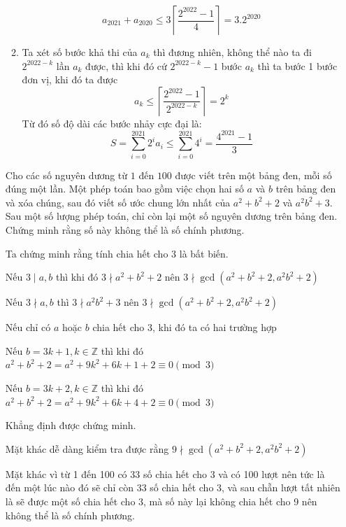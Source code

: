 \documentclass[11pt]{scrartcl}
\begin{document}
\begin{itemize}[label=, leftmargin=0em, itemsep=0.5em]
\begin{sol}
\begin{enumerate}
            $$
            a_{2021} + a_{2020} \leq 3\left\lceil \frac{2^{2022} - 1}{4}\right\rceil = 3.2^{2020}
            $$
            \item Ta xét số bước khả thi của $a_k$ thì đương nhiên, không thể nào ta đi $2^{2022 - k}$ lần $a_k$ được, thì khi đó cứ $2^{2022 - k} - 1$ bước $a_k$ thì ta bước 1 bước đơn vị, khi đó ta được
            $$
            a_k \leq \left\lceil \frac{2^{2022} - 1}{2^{2022 - k}} \right\rceil = 2^k
            $$
            Từ đó số độ dài các bước nhảy cực đại là:
            $$
            S = \sum_{i = 0}^{2021} 2^i a_i \leq \sum_{i=0}^{2021} 4^i = \frac{4^{2021}- 1}{3}
            $$
            \end{enumerate}
    \end{sol}
    \begin{bt}
        Cho các số nguyên dương từ $1$ đến $100$ được viết trên một bảng đen, mỗi số đúng một lần. Một phép toán bao gồm việc chọn hai số $a$ và $b$ trên bảng đen và xóa chúng, sau đó viết số ước chung lớn nhất của $a^2+b^2+2$ và $a^2b^2+3$. Sau một số lượng phép toán, chỉ còn lại một số nguyên dương trên bảng đen. Chứng minh rằng số này không thể là số chính phương.
    \end{bt}

    \begin{sol}
        Ta chứng minh rằng tính chia hết cho $3$ là bất biến. 
        
        Nếu $3 \mid a,b$ thì khi đó $3\nmid a^2 + b^2 + 2$ nên $3 \nmid \gcd(a^2 + b^2 + 2, a^2b^2 + 2)$


        Nếu $3 \nmid a,b$ thì $3\nmid a^2b^2 +3$ nên $3 \nmid \gcd(a^2 + b^2 + 2, a^2b^2 + 2)$


        Nếu chỉ có $a$ hoặc $b$ chia hết cho $3$, khi đó ta có hai trường hợp


        Nếu $b = 3k + 1, k \in \mathbb{Z}$ thì khi đó $a^2 + b^2 + 2 = a^2 + 9k^2 + 6k + 1 + 2 \equiv 0 \pmod{3}$


        Nếu $b = 3k + 2, k \in \mathbb{Z}$ thì khi đó $a^2 + b^2 + 2 = a^2 +9k^2 + 6k + 4 + 2 \equiv 0 \pmod{3}$


        Khẳng định được chứng minh.


        Mặt khác dễ dàng kiểm tra được rằng $ 9 \nmid \gcd(a^2 + b^2 + 2, a^2b^2 + 2)$


        Mặt khác vì từ 1 đến 100 có $33$ số chia hết cho 3 và có 100 lượt nên tức là đến một lúc nào đó sẽ chỉ còn $33$ số chia hết cho 3, và sau chẵn lượt tất nhiên là sẽ được một số chia hết cho 3, mà số này lại không chia hết cho 9 nên không thể là số chính phương.
    \end{sol}


\end{itemize}
\end{document}
